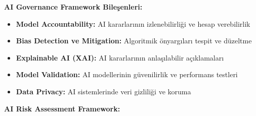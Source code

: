 \textbf{AI Governance Framework Bileşenleri:}
\begin{itemize}
    \item \textbf{Model Accountability:} AI kararlarının izlenebilirliği ve hesap verebilirlik
    \item \textbf{Bias Detection ve Mitigation:} Algoritmik önyargıları tespit ve düzeltme
    \item \textbf{Explainable AI (XAI):} AI kararlarının anlaşılabilir açıklamaları
    \item \textbf{Model Validation:} AI modellerinin güvenilirlik ve performans testleri
    \item \textbf{Data Privacy:} AI sistemlerinde veri gizliliği ve koruma
\end{itemize}

\textbf{AI Risk Assessment Framework:}
